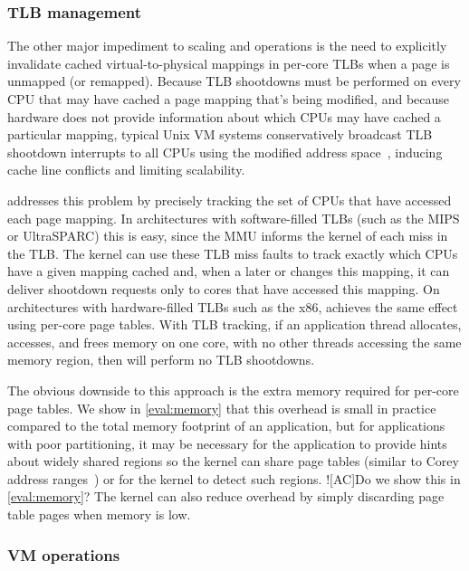 \subsubsection{TLB management}
\label{sec:radixvm:tlb}

The other major impediment to scaling  and 
operations is the need to explicitly invalidate cached
virtual-to-physical mappings in per-core TLBs when a page is unmapped
(or remapped).
%
Because TLB shootdowns must be performed on every CPU that may have
cached a page mapping that's being modified, and because hardware does
not provide
information about which CPUs may have cached a particular mapping,
typical Unix VM systems conservatively broadcast TLB shootdown
interrupts to all
CPUs using the modified address space~\cite{mach:tlb}, inducing cache
line conflicts
and limiting scalability.

\vm addresses this problem by precisely tracking the set of CPUs that
have accessed each page mapping.
%
In architectures with software-filled TLBs (such as the MIPS or
UltraSPARC) this is easy, since the MMU informs the kernel of each
miss in the TLB.  The kernel can use these TLB miss faults to track
exactly which CPUs have a given mapping cached and, when a later
 or  changes this mapping, it can deliver
shootdown requests
only to cores that have accessed this mapping.  On architectures
with hardware-filled TLBs such as the x86, \vm achieves the
same effect using per-core page tables.
%
With TLB tracking, if an application thread
allocates, accesses, and frees memory on one core, with no other threads
accessing the same memory region, then \vm will perform no TLB shootdowns.

The obvious downside to this approach is the extra memory required for
per-core page tables.  We show in \cref{eval:memory} that this
overhead is small in practice compared to the total memory footprint
of an application, but for applications with poor partitioning, it may
be necessary for the application to provide hints about widely shared
regions so the kernel can share page tables (similar to Corey address
ranges~\cite{boyd-wickizer:corey}) or for the kernel to detect such
regions.
%
\XXX![AC]{Do we show this in \cref{eval:memory}?}
%
The kernel can also reduce overhead by simply discarding page table
pages when memory is low.

\subsubsection{VM operations}
\label{sec:radixvm:ops}

